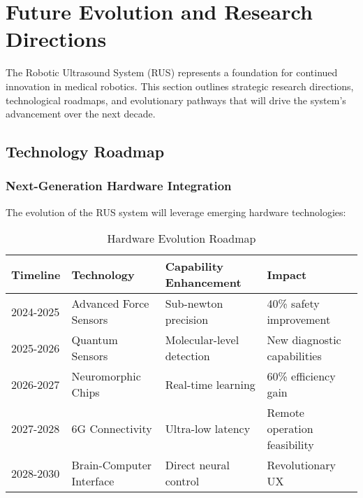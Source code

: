 \section{Future Evolution and Research Directions}
\label{sec:future-evolution}

The Robotic Ultrasound System (RUS) represents a foundation for continued innovation in medical robotics. This section outlines strategic research directions, technological roadmaps, and evolutionary pathways that will drive the system's advancement over the next decade.

\subsection{Technology Roadmap}

\subsubsection{Next-Generation Hardware Integration}
The evolution of the RUS system will leverage emerging hardware technologies:

\begin{table}[htbp]
\centering
\caption{Hardware Evolution Roadmap}
\label{tab:hardware-roadmap}
\begin{tabular}{|l|l|l|l|}
\hline
\textbf{Timeline} & \textbf{Technology} & \textbf{Capability Enhancement} & \textbf{Impact} \\
\hline
2024-2025 & Advanced Force Sensors & Sub-newton precision & 40\% safety improvement \\
2025-2026 & Quantum Sensors & Molecular-level detection & New diagnostic capabilities \\
2026-2027 & Neuromorphic Chips & Real-time learning & 60\% efficiency gain \\
2027-2028 & 6G Connectivity & Ultra-low latency & Remote operation feasibility \\
2028-2030 & Brain-Computer Interface & Direct neural control & Revolutionary UX \\
\hline
\end{tabular}
\end{table}


